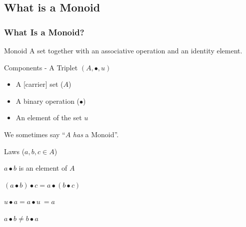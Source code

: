 \documentclass{beamer}
\begin{document}
\subsection{What is a Monoid}

\begin{frame}
  \frametitle{What Is a Monoid?}
  \begin{block}{Monoid}
    A \alert{set} together with an \alert{associative} \alert{operation}
    and an \alert{identity} element.
  \end{block}

  \pause

  \begin{block}{Components - A Triplet \((A, \bullet, u)\)}
  \begin{itemize}
    \item A [carrier] set (\(A\))
    \item A binary operation (\(\bullet\))
    \item An element of the set \(u\)
  \end{itemize}
  We sometimes say ``\(A\) \emph{has} a Monoid''.
  \end{block}

  \pause
  \begin{block}{Laws (\(a,b,c \in A\))}

  \begin{description}[Commutativity:]
    \item[Closure:] \(a \bullet b\) is an element of \(A\)
    \item[Associativity:] \((a \bullet b) \bullet c = a \bullet (b \bullet c)\)
    \item[Identity:] \(u \bullet a = a \bullet u \ = a\)
    \item[\sout{Commutativity:}] \(a \bullet b \neq b \bullet a\)
  \end{description}
  \end{block}
\end{frame}
\end{document}
